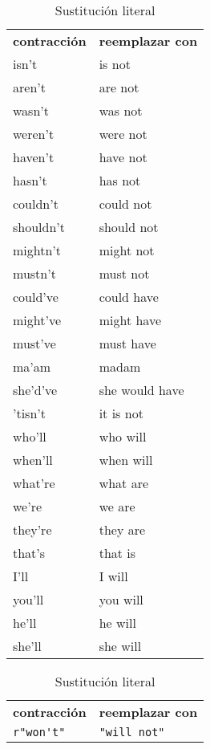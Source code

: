 \begin{table}[htbp]
\centering
\begin{subtable}[t]{0.45\linewidth}
\centering
\begin{tabular}{|l|l|}
\hline
\textbf{contracción} & \textbf{reemplazar con} \\ \hhline{==}
isn't & is not \\ \hline
aren't & are not \\ \hline
wasn't & was not \\ \hline
weren't & were not \\ \hline
haven't & have not \\ \hline
hasn't & has not \\ \hline
couldn't & could not \\ \hline
shouldn't & should not \\ \hline
mightn't & might not \\ \hline
mustn't & must not \\ \hline
could've & could have \\ \hline
might've & might have \\ \hline
must've & must have \\ \hline
ma'am & madam \\ \hline
she'd've & she would have \\ \hline
'tisn't & it is not \\ \hline
who'll & who will \\ \hline
when'll & when will \\ \hline
what're & what are \\ \hline
we're & we are \\ \hline
they're & they are \\ \hline
that's & that is \\ \hline
I'll & I will \\ \hline
you'll & you will \\ \hline
he'll & he will \\ \hline
she'll & she will \\ \hline
\end{tabular}
\caption{Sustitución literal}
\label{tbl:contracciones-directa}
\end{subtable}
\begin{subtable}[t]{0.45\linewidth}
\centering
\begin{tabular}{|l|l|}
\hline
\textbf{contracción} & \textbf{reemplazar con} \\ \hhline{==}
\verb=r"won't"= & \verb="will not"= \\ \hline

\end{tabular}
\end{subtable}
\end{table}
